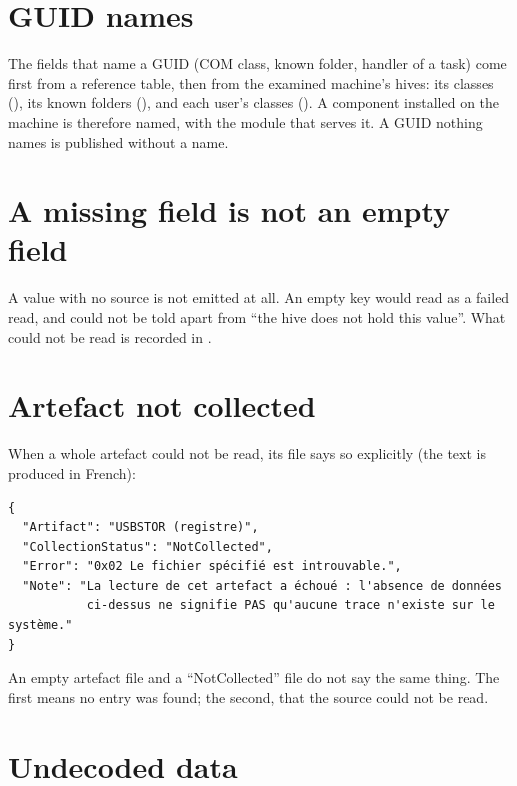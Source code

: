 \documentclass[11pt,a4paper,oneside]{report}
\begin{document}
\section{GUID names}

The fields that name a GUID (COM class, known folder, handler of a task) come
first from a reference table, then from the examined machine's hives: its
classes (), its
known folders (), and each user's classes
(). A component installed on the machine is therefore
named, with the module that serves it. A GUID nothing names is published
without a name.

\section{A missing field is not an empty field}

A value with no source is not emitted at all. An empty key would read as a
failed read, and could not be told apart from ``the hive does not hold this
value''. What could not be read is recorded in .

\section{Artefact not collected}

When a whole artefact could not be read, its file says so explicitly (the text
is produced in French):

\begin{lstlisting}
{
  "Artifact": "USBSTOR (registre)",
  "CollectionStatus": "NotCollected",
  "Error": "0x02 Le fichier spécifié est introuvable.",
  "Note": "La lecture de cet artefact a échoué : l'absence de données
           ci-dessus ne signifie PAS qu'aucune trace n'existe sur le système."
}
\end{lstlisting}

\begin{attention}
An empty artefact file and a ``NotCollected'' file do not say the same thing.
The first means no entry was found; the second, that the source could not be
read.
\end{attention}

\section{Undecoded data}
\end{document}
